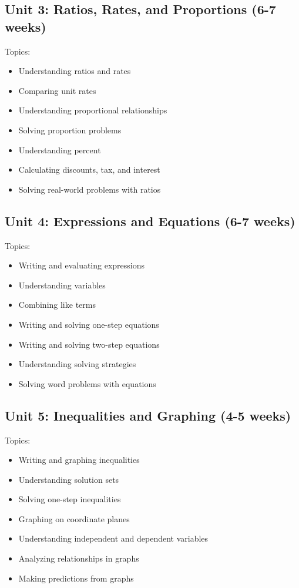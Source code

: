 \documentclass[11pt,letterpaper]{report}
\begin{document}
\subsection{Unit 3: Ratios, Rates, and Proportions (6-7 weeks)}

Topics:
\begin{itemize}
\item Understanding ratios and rates
\item Comparing unit rates
\item Understanding proportional relationships
\item Solving proportion problems
\item Understanding percent
\item Calculating discounts, tax, and interest
\item Solving real-world problems with ratios
\end{itemize}

\subsection{Unit 4: Expressions and Equations (6-7 weeks)}

Topics:
\begin{itemize}
\item Writing and evaluating expressions
\item Understanding variables
\item Combining like terms
\item Writing and solving one-step equations
\item Writing and solving two-step equations
\item Understanding solving strategies
\item Solving word problems with equations
\end{itemize}

\subsection{Unit 5: Inequalities and Graphing (4-5 weeks)}

Topics:
\begin{itemize}
\item Writing and graphing inequalities
\item Understanding solution sets
\item Solving one-step inequalities
\item Graphing on coordinate planes
\item Understanding independent and dependent variables
\item Analyzing relationships in graphs
\item Making predictions from graphs
\end{itemize}
\end{document}
